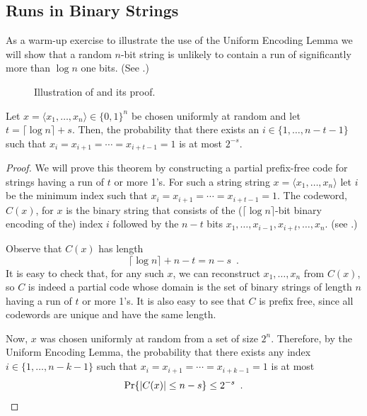 \documentclass{patmorin}
\begin{document}
\subsection{Runs in Binary Strings}

As a warm-up exercise to illustrate the use of the Uniform Encoding
Lemma we will show that a random $n$-bit string is unlikely to contain
a run of significantly more than $\log n$ one bits.  (See .)

\begin{figure}
  \caption{Illustration of  and its proof.}
\end{figure}

\begin{thm}
  Let $x=\langle x_1,\ldots,x_n\rangle\in\{0,1\}^n$ be chosen
  uniformly at random and let $t=\lceil\log n\rceil + s$. Then, the
  probability that there exists an $i\in\{1,\ldots,n-t-1\}$ such that
  $x_i=x_{i+1}=\cdots=x_{i+t-1}=1$ is at most $2^{-s}$.
\end{thm}

\begin{proof}
  We will prove this theorem by constructing a partial prefix-free
  code for strings having a run of $t$ or more 1's.  For such a string
  string $x=\langle x_1,\ldots,x_n\rangle$ let $i$ be the minimum index
  such that $x_i=x_{i+1}=\cdots=x_{i+t-1}=1$. The codeword, $C(x)$,
  for $x$ is the binary string that consists of the ($\lceil\log
   n\rceil$-bit binary encoding of the) index $i$ followed by the $n-t$
  bits $x_1,\ldots,x_{i-1},x_{i+t},\ldots,x_n$. (see .)

  Observe that $C(x)$ has length 
  \[
      \lceil\log n\rceil + n - t = n-s \enspace .
  \]
  It is easy to check that, for any such $x$, we can reconstruct
  $x_1,\ldots,x_n$ from $C(x)$, so $C$ is indeed a partial code whose
  domain is the set of binary strings of length $n$ having a run of $t$
  or more 1's.  It is also easy to see that $C$ is prefix free, since
  all codewords are unique and have the same length.

  Now, $x$ was chosen uniformly at random from a set of size $2^{n}$.
  Therefore, by the Uniform Encoding Lemma, the probability
  that there exists any index $i\in\{1,\ldots,n-k-1\}$ such that
  $x_i=x_{i+1}=\cdots=x_{i+k-1}=1$ is at most
  \[
      \Pr\{|C(x)|\le n-s\} \le 2^{-s} \enspace . \qedhere 
  \]
\end{proof}
\end{document}
